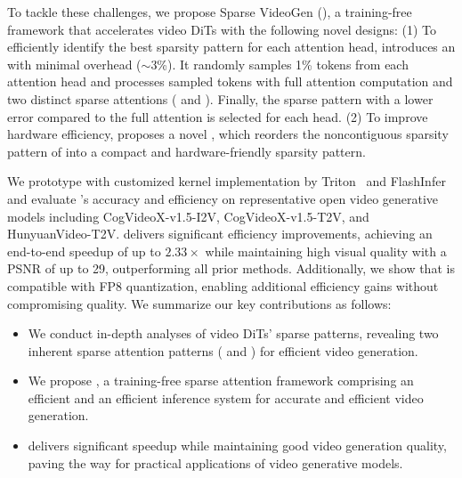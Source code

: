 To tackle these challenges, we propose Sparse VideoGen (\sys{}), a training-free framework that accelerates video DiTs with the following novel designs: (1) To efficiently identify the best sparsity pattern for each attention head, \sys{} introduces an \onlinesample{} with minimal overhead ($\sim$3\%). It randomly samples 1\% tokens from each attention head and processes sampled tokens with full attention computation and two distinct sparse attentions (\spatialhead{} and \temporalhead{}). Finally, the sparse pattern with a lower error compared to the full attention is selected for each head. (2) To improve hardware efficiency, \sys{} proposes a novel \reorder{}, which reorders the noncontiguous sparsity pattern of \temporalhead{} into a compact and hardware-friendly sparsity pattern.

We prototype \sys{} with customized kernel implementation by Triton~\cite{Tillet2019TritonAI} and FlashInfer~\cite{ye2025flashinferefficientcustomizableattention} and evaluate \sys{}'s accuracy and efficiency on representative open video generative models including CogVideoX-v1.5-I2V, CogVideoX-v1.5-T2V, and HunyuanVideo-T2V. \sys{} delivers significant efficiency improvements, achieving an end-to-end speedup of up to $2.33\times$ while maintaining high visual quality with a PSNR of up to 29, outperforming all prior methods. Additionally, we show that \sys{} is compatible with FP8 quantization, enabling additional efficiency gains without compromising quality. We summarize our key contributions as follows:

\begin{itemize}[leftmargin=*]
    \vspace{-5pt}
    \item 
    We conduct in-depth analyses of video DiTs' sparse patterns, revealing two inherent sparse attention patterns (\temporalhead{} and \spatialhead{}) for efficient video generation. 
    \item We propose \sys{}, a training-free sparse attention framework comprising an efficient \onlinesample{} and an efficient inference system for accurate and efficient video generation.
    \item \sys{} delivers significant speedup while maintaining good video generation quality, paving the way for practical applications of video generative models. 
\end{itemize}


